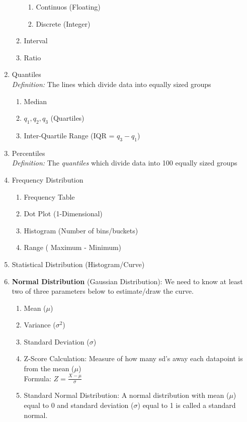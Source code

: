 \documentclass[11pt]{article}
\begin{document}
\begin{enumerate}
\begin{enumerate}
\begin{enumerate}
				\item Continuos (Floating)
				\item Discrete (Integer)
			\end{enumerate}
			\item Interval
			\item Ratio
		\end{enumerate}
		\item Quantiles\\
		\textit{Definition:} The lines which divide data into equally sized groups
		\begin{enumerate}
			\item Median
			\item $q_1 , q_2, q_3$ (Quartiles)
			\item Inter-Quartile Range (IQR = $q_3 - q_1$)
		\end{enumerate}
		\item Percentiles\\
		\textit{Definition:} The \textit{quantiles} which divide data into 100 equally sized groups
		\item Frequency Distribution
		\begin{enumerate}
			\item Frequency Table
			\item Dot Plot (1-Dimensional)
			\item Histogram (Number of bins/buckets)
			\item Range ( Maximum - Minimum)
		\end{enumerate}
		\item Statistical Distribution (Histogram/Curve)
		\item \textbf{Normal Distribution} (Gaussian Distribution): We need to know at least two of three parameters below to estimate/draw the curve.
		\begin{enumerate}
			\item Mean ($\mu$)
			\item Variance ($\sigma^2$)
			\item Standard Deviation ($\sigma$)
			\item Z-Score Calculation: Measure of how many sd's away each datapoint is from the mean ($ \mu $) \\
			Formula:
			$Z = \frac{X - \mu}{\sigma}$
			\item Standard Normal Distribution: A normal distribution with mean ($\mu$) equal to 0 and standard deviation ($\sigma$) equal to 1 is called a standard normal.
		\end{enumerate}

\end{enumerate}
\end{document}

